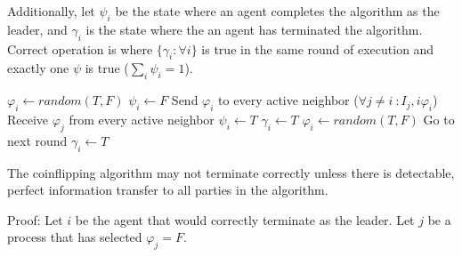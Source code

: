 Additionally, let $\psi_i$ be the state where an agent completes the algorithm as the leader, and $\gamma_i$ is the state where the an agent has terminated the algorithm.
Correct operation is where $\{\gamma_i : \forall i \}$ is true in the same round of execution and exactly one $\psi$ is true ($\sum_i \psi_i = 1$).

\begin{algorithmic}[1]
\small
\State $\varphi_i \gets random(T,F)$
\State $\psi_i \gets F$
\State Send $\varphi_i$ to every active neighbor ($\forall j \neq i\ : I_j,i \varphi_i$)
\State Receive $\varphi_j$ from every active neighbor 
	\State $\psi_i \gets T$
	\State $\gamma_i \gets T$
	\State $\varphi_i \gets random(T,F)$
	\State Go to next round
	\State $\gamma_i \gets T$
\EndIf
\end{algorithmic}

\begin{thm}
The coinflipping algorithm may not terminate correctly unless there is detectable, perfect information transfer to all parties in the algorithm.
\end{thm}

Proof: Let $i$ be the agent that would correctly terminate as the leader. Let $j$ be a process that has selected $\varphi_j = F$.

